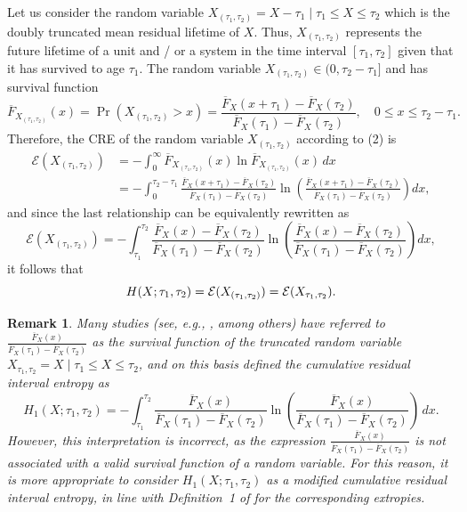\documentclass[11pt]{article}
\newtheorem{remark}{Remark}
\begin{document}
Let us consider the random variable $X_{(\tau_1, \tau_2)} = X - \tau_1 \mid \tau_1 \leq X \leq \tau_2$ which is the doubly truncated mean residual lifetime of $X$. Thus, $X_{(\tau_1,\tau_2)}$ represents the future lifetime of a unit and / or a system in the time interval $[\tau_1, \tau_2]$ given that it has survived to age $\tau_1$. The random variable $X_{(\tau_1,\tau_2)} \in (0, \tau_2 - \tau_1]$ and has survival function
$$ \textstyle
\overline{F}_{X_{(\tau_1,\tau_2)}}(x) = \Pr(X_{(\tau_1,\tau_2)} > x) = \frac{\overline{F}_X(x + \tau_1) - \overline{F}_X(\tau_2)}{\overline{F}_X(\tau_1) - \overline{F}_X(\tau_2)}, \quad 0 \leq x \leq \tau_2 - \tau_1. $$
Therefore, the CRE of the random variable $X_{(\tau_1,\tau_2)}$ according to (2) is
\begin{align*}
	\mathcal{E}(X_{(\tau_1,\tau_2)}) & = \textstyle -\int_0^\infty \overline{F}_{X_{(\tau_1,\tau_2)}}(x) \ln \overline{F}_{X_{(\tau_1,\tau_2)}}(x) \, dx \\
	& = \textstyle -\int_0^{\tau_2 - \tau_1} \frac{\overline{F}_X(x + \tau_1) - \overline{F}_X(\tau_2)}{\overline{F}_X(\tau_1) - \overline{F}_X(\tau_2)} \ln \left( \frac{\overline{F}_X(x + \tau_1) - \overline{F}_X(\tau_2)}{\overline{F}_X(\tau_1) - \overline{F}_X(\tau_2)} \right) dx,
\end{align*}
and since the last relationship can be equivalently rewritten as
$$ \textstyle
\mathcal{E}(X_{(\tau_1,\tau_2)}) = -\int_{\tau_1}^{\tau_2} \frac{\overline{F}_X(x) - \overline{F}_X(\tau_2)}{\overline{F}_X(\tau_1) - \overline{F}_X(\tau_2)} \ln \left( \frac{\overline{F}_X(x) - \overline{F}_X(\tau_2)}{\overline{F}_X(\tau_1) - \overline{F}_X(\tau_2)} \right) dx, $$
it follows that
$$ \textstyle \textstyle H(X;\tau_1,\tau_2 ) = \mathcal{E}(X_{(\tau_1,\tau_2)}) = \mathcal{E}(X_{\tau_1,\tau_2}). $$

 
\begin{remark}
	Many studies (see, e.g., \cite{Khorashadizadeh2013, Sekeh2015, Jalayeri2024}, among others) have referred to
	\( \textstyle
	\frac{\overline{F}_X(x)}{\overline{F}_X(\tau_1)-\overline{F}_X(\tau_2)}
	\)
	as the survival function of the truncated random variable \( \textstyle X_{\tau_1,\tau_2} = X \mid \tau_1 \le X \le \tau_2\), and on this basis defined the cumulative residual interval entropy as
	\[ \textstyle
	H_1(X; \tau_1, \tau_2) = -\int_{\tau_1}^{\tau_2}
	\frac{\overline{F}_X(x)}{\overline{F}_X(\tau_1)-\overline{F}_X(\tau_2)}
	\ln\!\left(
	\frac{\overline{F}_X(x)}{\overline{F}_X(\tau_1)-\overline{F}_X(\tau_2)}
	\right)\, dx.
	\]
	However, this interpretation is incorrect, as the expression
	\( \textstyle
	\frac{\overline{F}_X(x)}{\overline{F}_X(\tau_1)-\overline{F}_X(\tau_2)}
	\)
	is not associated with a valid survival function of a random variable. For this reason, it is more appropriate to consider \( \textstyle H_1(X; \tau_1, \tau_2)\) as a \emph{modified cumulative residual interval entropy}, in line with Definition~1 of \cite{Hashempour2024} for the corresponding extropies.
\end{remark}
\end{document}

